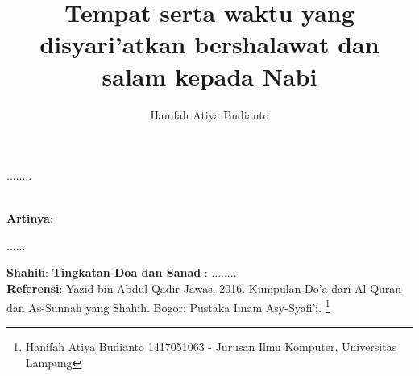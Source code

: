\documentclass[a4paper,12pt]{article}
\title{\Large Tempat serta waktu yang disyari'atkan bershalawat dan salam kepada Nabi}
\author{\calligra Hanifah Atiya Budianto}
\begin{document}
\sffamily
\maketitle 
\fullvocalize
{}
\begin{arabtext}
\noindent
........ \\ \\
\end{arabtext}
\noindent
\textbf{Artinya}:
\par
\indent
...... \\
\par
\noindent
\textbf{Shahih}: 
\textbf{Tingkatan Doa dan Sanad} : ........\\
\textbf{Referensi}: Yazid bin Abdul Qadir Jawas. 2016. Kumpulan Do'a dari
Al-Quran dan As-Sunnah yang Shahih. Bogor: Pustaka Imam Asy-Syafi'i.
\footnote{Hanifah Atiya Budianto 1417051063 - Jurusan Ilmu Komputer,
Universitas Lampung}
\end{document}
